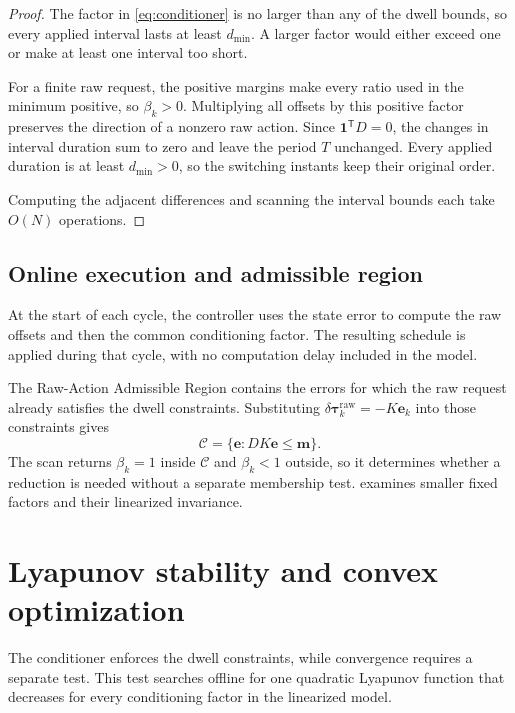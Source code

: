 \documentclass[pdflatex,iicol,sn-mathphys-ay]{sn-jnl}
\newcommand{\vect}[1]{\bm{#1}}
\newcommand{\dtau}{\delta\vect{\tau}}
\begin{document}
\begin{proof}
The factor in \eqref{eq:conditioner} is no larger than any of the dwell bounds, so every applied interval lasts at least $d_{\min}$. A larger factor would either exceed one or make at least one interval too short.

For a finite raw request, the positive margins make every ratio used in the minimum positive, so $\beta_k>0$. Multiplying all offsets by this positive factor preserves the direction of a nonzero raw action. Since $\vect{1}^{\mathsf T}D=0$, the changes in interval duration sum to zero and leave the period $T$ unchanged. Every applied duration is at least $d_{\min}>0$, so the switching instants keep their original order.

Computing the adjacent differences and scanning the interval bounds each take $O(N)$ operations.
\end{proof}

\subsection{Online execution and admissible region}

At the start of each cycle, the controller uses the state error to compute the raw offsets and then the common conditioning factor. The resulting schedule is applied during that cycle, with no computation delay included in the model.

The Raw-Action Admissible Region contains the errors for which the raw request already satisfies the dwell constraints. Substituting $\dtau_k^{\mathrm{raw}}=-K\vect{e}_k$ into those constraints gives
\begin{equation}
    \mathcal C=\{\vect{e}:DK\vect{e}\le\vect{m}\}.
    \label{eq:admissible-region}
\end{equation}
The scan returns $\beta_k=1$ inside $\mathcal C$ and $\beta_k<1$ outside, so it determines whether a reduction is needed without a separate membership test.  examines smaller fixed factors and their linearized invariance.

\section{Lyapunov stability and convex optimization}
\label{sec:stability}

The conditioner enforces the dwell constraints, while convergence requires a separate test. This test searches offline for one quadratic Lyapunov function that decreases for every conditioning factor in the linearized model.
\end{document}
